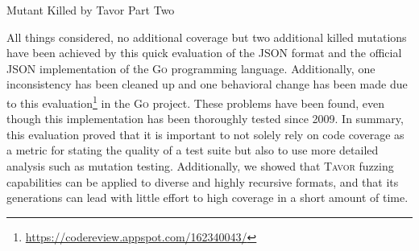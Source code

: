 \begin{listing}[H]
\caption{Mutant Killed by Tavor Part Two}
\label{lst:killed-mutant-part-2}
\begin{textcode}
--- /home/symflower/json/json/original/src/json/decode.go 2017-12-01 18:53:43.147579808 +0100
+++ /tmp/go-mutesting-288106446//home/symflower/json/json/original/src/json/decode.go.183 2017-12-03 10:14:54.687623329 +0100
@@ -998,7 +998,7 @@
    op := d.scanWhile(scanSkipSpace)
    if op == scanEndObject {
      // closing } - can only happen on first iteration.
-     break
+
    }
    if op != scanBeginLiteral {
      d.error(errPhase)
FAIL "/tmp/go-mutesting-288106446//home/symflower/json/json/original/src/json/decode.go.183" with checksum 684f5c20122977ca389bb307ee0db6f7
\end{textcode}
\end{listing}


All things considered, no additional coverage but two additional killed mutations have been achieved by this quick evaluation of the JSON format and the official JSON implementation of the \textsc{Go} programming language. Additionally, one inconsistency has been cleaned up and one behavioral change has been made due to this evaluation\footnote{\url{https://codereview.appspot.com/162340043/}} in the \textsc{Go} project. These problems have been found, even though this implementation has been thoroughly tested since 2009. In summary, this evaluation proved that it is important to not solely rely on code coverage as a metric for stating the quality of a test suite but also to use more detailed analysis such as mutation testing. Additionally, we showed that \textsc{Tavor} fuzzing capabilities can be applied to diverse and highly recursive formats, and that its generations can lead with little effort to high coverage in a short amount of time.

\afterpage{\clearpage}
